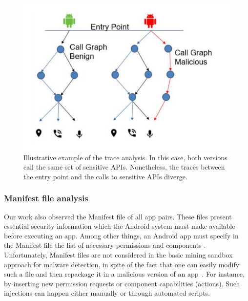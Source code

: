 \begin{figure}[ht]
\centering
\includegraphics[scale=0.25]{images/maliciousCallGraph.pdf}
\caption{Illustrative example of the trace analysis. In this case, both versions call the same set of sensitive APIs. Nonetheless,
 the traces between the entry point and the calls to sensitive APIs diverge.}
 \label{fig:callGraph}
\end{figure}


\subsubsection{Manifest file analysis}\label{sec:manifestAnalysis}

Our work also observed the Manifest file of all app pairs. These files present essential security information which the Android system must make available before executing an app. Among other things, an Android app must specify in the Manifest file the list of necessary permissions and components . Unfortunately, Manifest files are not considered in the basic mining sandbox approach for malware detection, in spite of the fact that one can easily modify such a file and then repackage it in a malicious version of an app~\cite{DBLP:journals/corr/abs-1208-4536}. For instance, by inserting new permission requests or component capabilities (actions). Such injections can happen either manually or through automated scripts.


